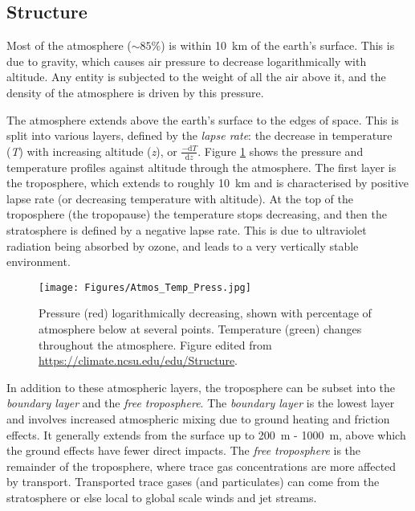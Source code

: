   
  \subsection{Structure}
  \label{LR:Atmos:Struct}
    
    Most of the atmosphere ($\sim 85\%$) is within 10~km of the earth's surface.
    This is due to gravity, which causes air pressure to decrease logarithmically with altitude.
    Any entity is subjected to the weight of all the air above it, and the density of the atmosphere is driven by this pressure.
    
    The atmosphere extends above the earth's surface to the edges of space. 
    This is split into various layers, defined by the \textit{lapse rate}: the decrease in temperature (\textit{T}) with increasing altitude (\textit{z}), or $\frac{-\textrm{d}T}{\textrm{d}z}$.
    Figure \ref{LR:Atmos:Struct:Fig_atmos_layers} shows the pressure and temperature profiles against altitude through the atmosphere.
    The first layer is the troposphere, which extends to roughly 10~km and is characterised by positive lapse rate (or decreasing temperature with altitude).
    At the top of the troposphere (the tropopause) the temperature stops decreasing, and then the stratosphere is defined by a negative lapse rate.
    This is due to ultraviolet radiation being absorbed by ozone, and leads to a very vertically stable environment.
    
    \begin{figure}
      \texttt{[image: Figures/Atmos\_Temp\_Press.jpg]}
      \caption{%
        Pressure (red) logarithmically decreasing, shown with percentage of atmosphere below at several points.
        Temperature (green) changes throughout the atmosphere.
        Figure edited from \url{https://climate.ncsu.edu/edu/Structure}.
      }
      \label{LR:Atmos:Struct:Fig_atmos_layers}
    \end{figure}
    
    
    
    In addition to these atmospheric layers, the troposphere can be subset into the \textit{boundary layer} and the \textit{free troposphere}.
    The \textit{boundary layer} is the lowest layer and involves increased atmospheric mixing due to ground heating and friction effects.
    It generally extends from the surface up to 200~m - 1000~m, above which the ground effects have fewer direct impacts.
    The \textit{free troposphere} is the remainder of the troposphere, where trace gas concentrations are more affected by transport.
    Transported trace gases (and particulates) can come from the stratosphere or else local to global scale winds and jet streams.
    
